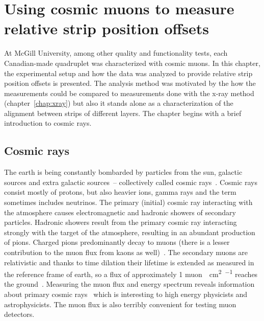 
\chapter{Using cosmic muons to measure relative strip position offsets}
\label{chap:cosmics}

At McGill University, among other quality and functionality tests, each Canadian-made quadruplet was characterized with cosmic muons. In this chapter, the experimental setup and how the data was analyzed to provide relative strip position offsets is presented. The analysis method was motivated by the how the measurements could be compared to measurements done with the x-ray method (chapter~\ref{chap:xray}) but also it stands alone as a characterization of the alignment between strips of different layers. The chapter begins with a brief introduction to cosmic rays.

\section{Cosmic rays}

The earth is being constantly bombarded by particles from the sun, galactic sources and extra galactic sources~-- collectively called cosmic rays~\cite{boezio_chemical_2012, zyla_review_2020}. Cosmic rays consist mostly of protons, but also heavier ions, gamma rays and the term sometimes includes neutrinos. The primary (initial) cosmic ray interacting with the atmosphere causes electromagnetic and hadronic showers of secondary particles. Hadronic showers result from the primary cosmic ray interacting strongly with the target of the atmosphere, resulting in an abundant production of pions. Charged pions predominantly decay to muons (there is a lesser contribution to the muon flux from kaons as well)~\cite{grieder_cosmic_2001}. The secondary muons are relativistic and thanks to time dilation their lifetime is extended as measured in the reference frame of earth, so a flux of approximately 1 muon\SI{}{\per\cm\squared\per\min} reaches the ground~\cite{zyla_review_2020}. Measuring the muon flux and energy spectrum reveals information about primary cosmic rays~\cite{grieder_cosmic_2001} which is interesting to high energy physicists and astrophysicists. The muon flux is also terribly convenient for testing muon detectors.

